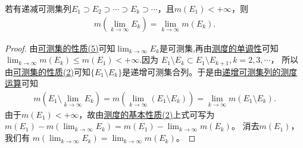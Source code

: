 \documentclass[../../main.tex]{subfiles}%
\begin{document}
\begin{corollary}[递减可测集列的测度运算]\label{corollary:递减可测集列的测度运算}
若有递减可测集列$E_1\supset E_2\supset\cdots\supset E_k\supset\cdots$，且$m(E_1)<+\infty$，则
\begin{align}
m\left(\lim_{k\to\infty}E_k\right)=\lim_{k\to\infty}m(E_k).\label{eq:2.5}
\end{align}
\end{corollary}
\begin{proof}

由\hyperref[theorem:可测集的性质]{可测集的性质(5)}可知$\lim_{k\to\infty}E_k$是可测集,再由\hyperref[theorem:测度的基本性质]{测度的单调性}可知$\lim_{k\to\infty}m(E_k)\leqslant  m(E_1)<+\infty$.因为
$E_1\setminus E_k\subset E_1\setminus E_{k + 1},k = 2,3,\cdots$，
所以由\hyperref[theorem:可测集的性质]{可测集的性质(2)}可知$\{E_1\setminus E_k\}$是递增可测集合列。于是由\hyperref[theorem:递增可测集列的测度运算]{递增可测集列的测度运算}可知
\begin{align*}
m\left(E_1\setminus\lim_{k\to\infty}E_k\right)=m\left(\lim_{k\to\infty}(E_1\setminus E_k)\right)
=\lim_{k\to\infty}m(E_1\setminus E_k).
\end{align*}
由于$m(E_1)<+\infty$，故由\hyperref[theorem:测度的基本性质]{测度的基本性质(2)}上式可写为
$m(E_1)-m\left(\lim_{k\to\infty}E_k\right)=m(E_1)-\lim_{k\to\infty}m(E_k)$。
消去$m(E_1)$，我们有
$m\left(\lim_{k\to\infty}E_k\right)=\lim_{k\to\infty}m(E_k)$。 

\end{proof}
\end{document}
